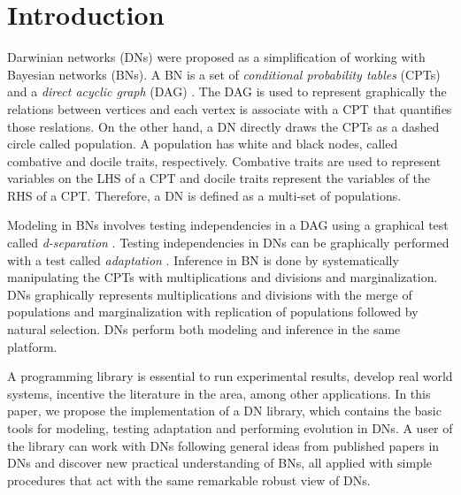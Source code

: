 %
\chapter{Introduction}
\label{sec:intro}


Darwinian networks (DNs) \cite{butzOliveiraSantosCai15} were proposed as a simplification of working with Bayesian networks (BNs).
A BN is a set of \emph{conditional probability tables} (CPTs) and a \emph{direct acyclic graph} (DAG) \cite{pear88}.
The DAG is used to represent graphically the relations between vertices and each vertex is associate with a CPT that quantifies those reslations.
On the other hand, a DN directly draws the CPTs as a dashed circle called population.
A population has white and black nodes, called combative and docile traits, respectively.
Combative traits are used to represent variables on the LHS of a CPT and docile traits represent the variables of the RHS of a CPT.
Therefore, a DN is defined as a multi-set of populations.

Modeling in BNs involves testing independencies in a DAG using a graphical test called \emph{d-separation} \cite{pear88}.
Testing independencies in DNs can be graphically performed with a test called \emph{adaptation} \cite{butzOliveiraSantosCai15}.
Inference in BN is done by systematically manipulating the CPTs with multiplications and divisions and marginalization.
DNs graphically represents multiplications and divisions with the merge of populations and marginalization with replication of populations followed by natural selection.
DNs perform both modeling and inference in the same platform.

A programming library is essential to run experimental results, develop real world systems, incentive the literature in the area, among other applications.
In this paper, we propose the implementation of a DN library, which contains the basic tools for modeling, testing adaptation and performing evolution in DNs.
A user of the library can work with DNs following general ideas from published papers in DNs \cite{butzOliveiraSantosCai15} and discover new practical understanding of BNs, all applied with simple procedures that act with the same remarkable robust view of DNs.

